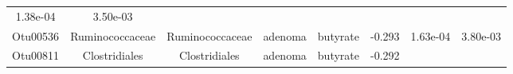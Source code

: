\documentclass[11pt,]{article}
\begin{document}
\begin{longtable}[]{@{}cccccccc@{}}
\begin{minipage}[t]{0.08\columnwidth}
1.38e-04\strut
\end{minipage} & \begin{minipage}[t]{0.08\columnwidth}\centering\strut
3.50e-03\strut
\end{minipage}\tabularnewline
\begin{minipage}[t]{0.08\columnwidth}\centering\strut
Otu00536\strut
\end{minipage} & \begin{minipage}[t]{0.15\columnwidth}\centering\strut
Ruminococcaceae\strut
\end{minipage} & \begin{minipage}[t]{0.15\columnwidth}\centering\strut
Ruminococcaceae\strut
\end{minipage} & \begin{minipage}[t]{0.08\columnwidth}\centering\strut
adenoma\strut
\end{minipage} & \begin{minipage}[t]{0.09\columnwidth}\centering\strut
butyrate\strut
\end{minipage} & \begin{minipage}[t]{0.07\columnwidth}\centering\strut
-0.293\strut
\end{minipage} & \begin{minipage}[t]{0.08\columnwidth}\centering\strut
1.63e-04\strut
\end{minipage} & \begin{minipage}[t]{0.08\columnwidth}\centering\strut
3.80e-03\strut
\end{minipage}\tabularnewline
\begin{minipage}[t]{0.08\columnwidth}\centering\strut
Otu00811\strut
\end{minipage} & \begin{minipage}[t]{0.15\columnwidth}\centering\strut
Clostridiales\strut
\end{minipage} & \begin{minipage}[t]{0.15\columnwidth}\centering\strut
Clostridiales\strut
\end{minipage} & \begin{minipage}[t]{0.08\columnwidth}\centering\strut
adenoma\strut
\end{minipage} & \begin{minipage}[t]{0.09\columnwidth}\centering\strut
butyrate\strut
\end{minipage} & \begin{minipage}[t]{0.07\columnwidth}\centering\strut
-0.292\strut
\end{minipage} & \begin{minipage}[t]{0.08\columnwidth}\centering\strut

\end{minipage}
\end{longtable}
\end{document}
